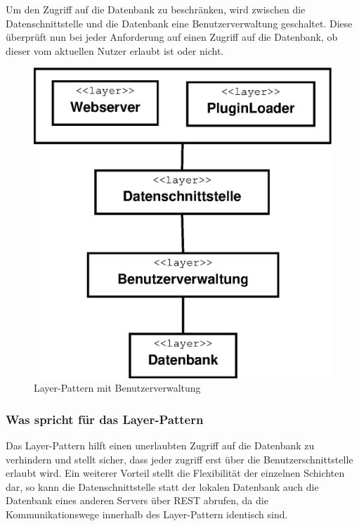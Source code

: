 Um den Zugriff auf die Datenbank zu beschränken, wird zwischen die Datenschnittstelle und die Datenbank eine Benutzerverwaltung geschaltet. Diese überprüft nun bei jeder Anforderung auf einen Zugriff auf die Datenbank, ob dieser vom aktuellen Nutzer erlaubt ist oder nicht.
\begin{figure}
	\vspace{-20pt}
\begin{center}
\includegraphics[width=1\linewidth]{Grafik/Diagramm/Layer}
\end{center}
\vspace{-15pt}
\caption[Layer-Klassen]{Layer-Pattern mit Benutzerverwaltung}
\label{fig:Layer}
\vspace{-50pt}
\end{figure}
\subsubsection{Was spricht für das Layer-Pattern}
Das Layer-Pattern hilft einen unerlaubten Zugriff auf die Datenbank zu verhindern und stellt sicher, dass jeder zugriff erst über die Benutzerschnittstelle erlaubt wird. Ein weiterer Vorteil stellt die Flexibilität der einzelnen Schichten dar, so kann die Datenschnittstelle statt der lokalen Datenbank auch die Datenbank eines anderen Servers über REST abrufen, da die Kommunikationswege innerhalb des Layer-Pattern identisch sind.
\vspace{30pt}